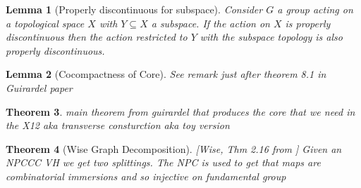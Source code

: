 \documentclass{article}
\theoremstyle{mystyle}
\newtheorem{thm}{Theorem}[section]
\newtheorem{lem}[thm]{Lemma}
\theoremstyle{remark}
\begin{document}
\begin{lem}
    [Properly discontinuous for subspace]
    \label{lem:pdsubspace}
    Consider $G$ a group acting on a topological space $X$ with $Y \subseteq X$ a subspace. If the action on $X$ is properly discontinuous then the action restricted to $Y$ with the subspace topology is also properly discontinuous. 
\end{lem}
\begin{lem}
    [Cocompactness of Core]
    See remark just after theorem 8.1 in Guirardel paper
\end{lem}
\begin{thm}
\label{thm:guirardelcore}
main theorem from guirardel that produces the core that we need in the X12 aka transverse consturction aka toy version
\end{thm}
\begin{thm}[Wise Graph Decomposition]
\label{thm:wisegraph}[Wise, Thm 2.16 from \cite{wisecsc}]
Given an NPCCC VH we get two splittings. The NPC is used to get that maps are combinatorial immersions and so injective on fundamental group
\end{thm}
\end{document}
